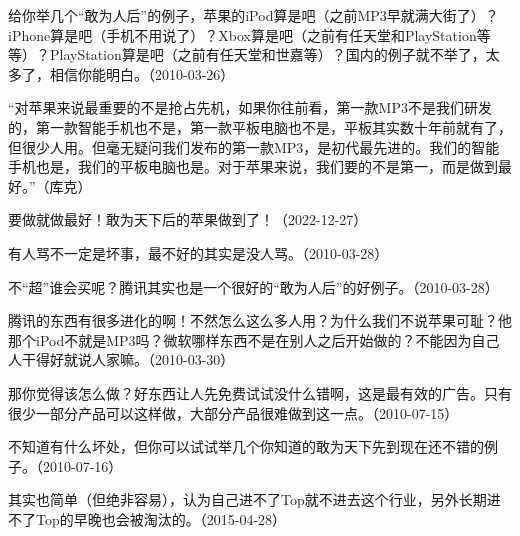 
给你举几个“敢为人后”的例子，苹果的iPod算是吧（之前MP3早就满大街了）？iPhone算是吧（手机不用说了）？Xbox算是吧（之前有任天堂和PlayStation等等）？PlayStation算是吧（之前有任天堂和世嘉等）？国内的例子就不举了，太多了，相信你能明白。（2010-03-26）

“对苹果来说最重要的不是抢占先机，如果你往前看，第一款MP3不是我们研发的，第一款智能手机也不是，第一款平板电脑也不是，平板其实数十年前就有了，但很少人用。但毫无疑问我们发布的第一款MP3，是初代最先进的。我们的智能手机也是，我们的平板电脑也是。对于苹果来说，我们要的不是第一，而是做到最好。”（库克）

要做就做最好！敢为天下后的苹果做到了！（2022-12-27）


有人骂不一定是坏事，最不好的其实是没人骂。（2010-03-28）


不“超”谁会买呢？腾讯其实也是一个很好的“敢为人后”的好例子。（2010-03-28）

腾讯的东西有很多进化的啊！不然怎么这么多人用？为什么我们不说苹果可耻？他那个iPod不就是MP3吗？微软哪样东西不是在别人之后开始做的？不能因为自己人干得好就说人家嘛。（2010-03-30）


那你觉得该怎么做？好东西让人先免费试试没什么错啊，这是最有效的广告。只有很少一部分产品可以这样做，大部分产品很难做到这一点。（2010-07-15）


不知道有什么坏处，但你可以试试举几个你知道的敢为天下先到现在还不错的例子。（2010-07-16）


其实也简单（但绝非容易），认为自己进不了Top就不进去这个行业，另外长期进不了Top的早晚也会被淘汰的。（2015-04-28）


